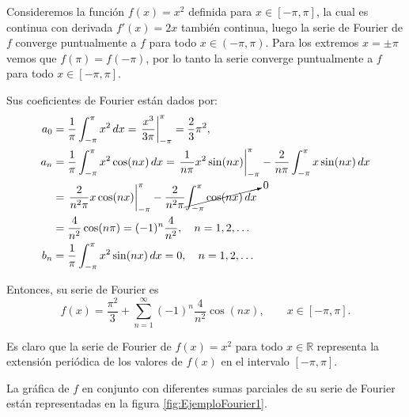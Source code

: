 \begin{ejemplo} \label{EjemploFourier1}
    Consideremos la función $f(x) = x^2$ definida para $x\in [-\pi,\pi]$, la cual es continua con derivada $f'(x) = 2x$ también continua, luego la serie de Fourier de $f$ converge puntualmente a $f$ para todo $x \in (-\pi,\pi)$. Para los extremos $x = \pm \pi$ vemos que $f(\pi) = f(-\pi)$, por lo tanto la serie converge puntualmente a $f$ para todo $x \in [-\pi,\pi]$.
    
    Sus coeficientes de Fourier están dados por:
    \begin{align*}
        a_0 &= \frac{1}{\pi} \int_{-\pi}^{\pi} x^2 \,dx = \left. \frac{x^3}{3\pi} \right|_{-\pi}^{\pi} = \frac{2}{3} \pi^2, \\
        a_n &= \frac{1}{\pi} \int_{-\pi}^{\pi} x^2 \cos(n x)\,dx =   \left. \frac{1}{n\pi} x^2 \sin(nx)  \right|_{-\pi}^{\pi} - \frac{2}{n\pi} \int_{-\pi}^{\pi} x \sin(nx) \,dx\\
        &= \left.   \frac{2}{n^2\pi} x \cos(nx)\right|_{-\pi}^{\pi} - \frac{2}{n^2 \pi} \cancelto{0}{\int_{-\pi}^{\pi} \cos(nx) \,dx }\\
        &=  \frac{4}{n^2} \cos(n\pi) =  (-1)^n \frac{4}{n^2}, \quad n = 1,2,\dots\\
         b_n &= \frac{1}{\pi} \int_{-\pi}^{\pi} x^2 \sin(nx)\,dx = 0, \quad n = 1,2, \dots
    \end{align*}
    
    Entonces, su serie de Fourier es
    \begin{equation}
    f(x) = \frac{\pi^2}{3} + \sum_{n=1}^{\infty} (-1)^n \frac{4}{n^2} \cos(nx), \qquad x \in [-\pi,\pi].    \label{FourierCuadratica}
    \end{equation}
    
    Es claro que la serie de Fourier de $f(x) = x^2$ para todo $x\in \mathbb{R}$ representa la extensión periódica de los valores de $f(x)$ en el intervalo $[-\pi,\pi]$.
    
    La gráfica de $f$ en conjunto con diferentes sumas parciales de su serie de Fourier están representadas en la figura \ref{fig:EjemploFourier1}. 
    

\end{ejemplo}
